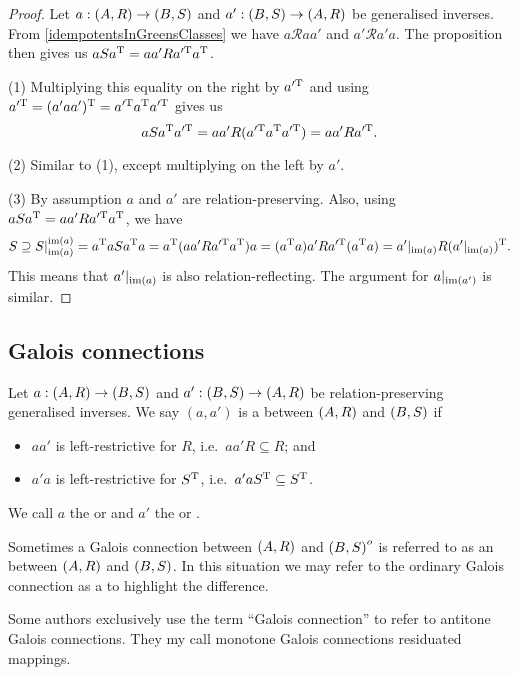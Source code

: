 \begin{proof}
Let $a: \sSet{A,R} \to \sSet{B,S}$ and $a': \sSet{B,S} \to \sSet{A,R}$ be generalised inverses. From \ref{idempotentsInGreensClasses} we have $a\mathcal{R}aa'$ and $a'\mathcal{R}a'a$. The proposition then gives us $aSa^{\mathrm{T}} = aa'Ra^{\prime\mathrm{T}} a^{\mathrm{T}}$.

(1) Multiplying this equality on the right by $a^{\prime\mathrm{T}}$ and using $a^{\prime\mathrm{T}} = (a'aa')^{\mathrm{T}} = a^{\prime\mathrm{T}} a^{\mathrm{T}} a^{\prime\mathrm{T}}$ gives us
\[ aSa^{\mathrm{T}} a^{\prime\mathrm{T}} = aa'R(a^{\prime\mathrm{T}} a^{\mathrm{T}} a^{\prime\mathrm{T}}) = aa'Ra^{\prime\mathrm{T}}. \]

(2) Similar to (1), except multiplying on the left by $a'$.

(3) By assumption $a$ and $a'$ are relation-preserving. Also, using $aSa^{\mathrm{T}} = aa'Ra^{\prime\mathrm{T}} a^{\mathrm{T}}$, we have
\[ S \supseteq S|_{\operatorname{im}(a)}^{\operatorname{im}(a)} = a^{\mathrm{T}} aSa^{\mathrm{T}} a = a^{\mathrm{T}} (aa'Ra^{\prime\mathrm{T}} a^{\mathrm{T}}) a = (a^{\mathrm{T}} a)a'Ra^{\prime\mathrm{T}} (a^{\mathrm{T}} a) = a'|_{\operatorname{im}(a)}R(a'|_{\operatorname{im}(a)})^{\mathrm{T}}. \]
This means that $a'|_{\operatorname{im}(a)}$ is also relation-reflecting. The argument for $a|_{\operatorname{im}(a')}$ is similar.
\end{proof}


\subsection{Galois connections}
\begin{definition}
Let $a: \sSet{A,R} \to \sSet{B,S}$ and $a': \sSet{B,S} \to \sSet{A,R}$ be relation-preserving generalised inverses. We say $(a,a')$ is a  between $\sSet{A, R}$ and $\sSet{B, S}$ if
\begin{itemize}
\item $aa'$ is left-restrictive for $R$, i.e.\ $aa'R \subseteq R$; and
\item $a'a$ is left-restrictive for $S^{\mathrm{T}}$, i.e.\ $a'aS^{\mathrm{T}} \subseteq S^{\mathrm{T}}$.
\end{itemize}
We call $a$ the  or  and $a'$ the  or .

Sometimes a Galois connection between $\sSet{A, R}$ and $\sSet{B, S}^o$ is referred to as an  between $\sSet{A, R}$ and $\sSet{B, S}$. In this situation we may refer to the ordinary Galois connection as a  to highlight the difference.
\end{definition}
Some authors exclusively use the term ``Galois connection'' to refer to antitone Galois connections. They my call monotone Galois connections residuated mappings.

